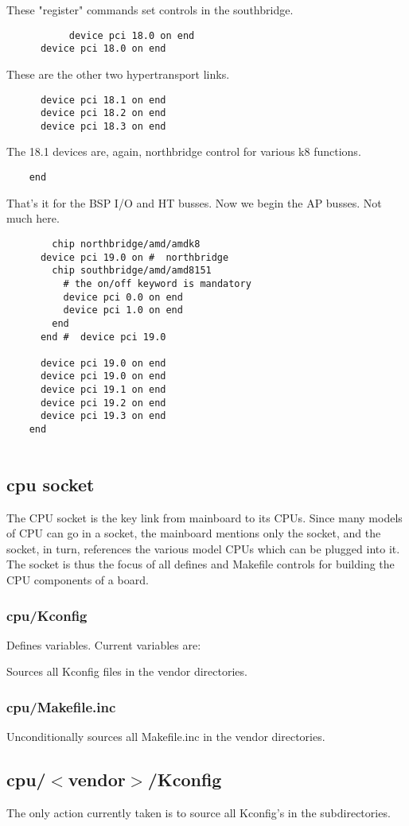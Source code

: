\documentclass[10pt,letterpaper]{article}
\begin{document}
These "register" commands set controls in the southbridge.
\begin{verbatim}
           device pci 18.0 on end
      device pci 18.0 on end
\end{verbatim}
These are the other two hypertransport links.
\begin{verbatim}
      device pci 18.1 on end
      device pci 18.2 on end
      device pci 18.3 on end
\end{verbatim}
The 18.1 devices are, again, northbridge control for various k8 functions.
\begin{verbatim}
    end
  \end{verbatim}
That's it for the BSP I/O and HT busses. Now we begin the AP busses. Not much here.
\begin{verbatim}
        chip northbridge/amd/amdk8
      device pci 19.0 on #  northbridge
        chip southbridge/amd/amd8151
          # the on/off keyword is mandatory
          device pci 0.0 on end
          device pci 1.0 on end
        end
      end #  device pci 19.0

      device pci 19.0 on end
      device pci 19.0 on end
      device pci 19.1 on end
      device pci 19.2 on end
      device pci 19.3 on end
    end


\end{verbatim}

\subsection{cpu socket}
The CPU socket is the key link from mainboard to its CPUs. Since many models of CPU can go in a socket, the mainboard mentions only
the socket, and the socket, in turn, references the various model CPUs which can be plugged into it. The socket is thus the focus
of all defines and Makefile controls for building the CPU components of a board.

\subsubsection{ cpu/Kconfig}
Defines variables. Current variables are:

Sources all Kconfig files in the vendor directories.
\subsubsection{ cpu/Makefile.inc}
Unconditionally sources all Makefile.inc in the vendor directories.

\subsection{cpu/$<$vendor$>$/Kconfig}
The only action currently taken is to source all Kconfig's in the
subdirectories.
\end{document}
